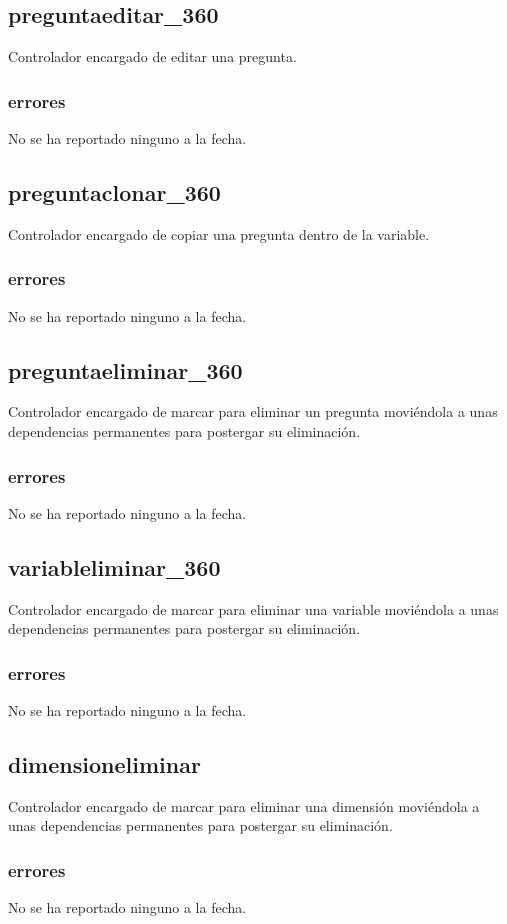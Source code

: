 \documentclass[10pt,a4paper]{book}
\begin{document}
	\subsection{preguntaeditar\_360}
	Controlador encargado de editar una pregunta.
	\subsubsection{errores}
	No se ha reportado ninguno a la fecha.
	
	\subsection{preguntaclonar\_360}
	Controlador encargado de copiar una pregunta dentro de la variable.
	\subsubsection{errores}
	No se ha reportado ninguno a la fecha.
	
	\subsection{preguntaeliminar\_360}
	Controlador encargado de marcar para eliminar un pregunta moviéndola a unas dependencias permanentes para postergar su eliminación.
	\subsubsection{errores}
	No se ha reportado ninguno a la fecha.
	
	\subsection{variableliminar\_360}
	Controlador encargado de marcar para eliminar una variable moviéndola a unas dependencias permanentes para postergar su eliminación.
	\subsubsection{errores}
	No se ha reportado ninguno a la fecha.
	
	\subsection{dimensioneliminar}
	Controlador encargado de marcar para eliminar una dimensión moviéndola a unas dependencias permanentes para postergar su eliminación.
	\subsubsection{errores}
	No se ha reportado ninguno a la fecha.
	
\end{document}
